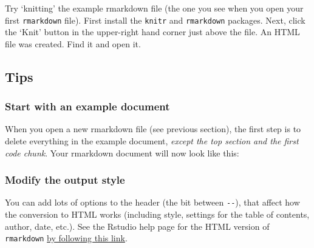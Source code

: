 \documentclass[]{book}
\newenvironment{Shaded}{\begin{snugshade}}{\end{snugshade}}
\newcommand{\DataTypeTok}[1]{\textcolor[rgb]{0.13,0.29,0.53}{#1}}
\newcommand{\NormalTok}[1]{#1}
\newcommand{\OperatorTok}[1]{\textcolor[rgb]{0.81,0.36,0.00}{\textbf{#1}}}
\newcommand{\StringTok}[1]{\textcolor[rgb]{0.31,0.60,0.02}{#1}}
\let\BeginKnitrBlock\begin \let\EndKnitrBlock\end
\begin{document}
\BeginKnitrBlock{rmdtry}
Try `knitting' the example rmarkdown file (the one you see when you open your first \texttt{rmarkdown} file). First install the \texttt{knitr} and \texttt{rmarkdown} packages. Next, click the `Knit' button in the upper-right hand corner just above the file. An HTML file was created. Find it and open it.
\EndKnitrBlock{rmdtry}

\hypertarget{tips}{%
\subsection{Tips}\label{tips}}

\hypertarget{start-with-an-example-document}{%
\subsubsection*{Start with an example document}\label{start-with-an-example-document}}

When you open a new rmarkdown file (see previous section), the first step is to delete everything in the example document, \emph{except the top section and the first code chunk}. Your rmarkdown document will now look like this:

\begin{Shaded}
\end{Shaded}

\hypertarget{modify-the-output-style}{%
\subsubsection*{Modify the output style}\label{modify-the-output-style}}

You can add lots of options to the header (the bit between \texttt{-\/-}), that affect how the conversion to HTML works (including style, settings for the table of contents, author, date, etc.). See the Rstudio help page for the HTML version of \texttt{rmarkdown} \href{https://bookdown.org/yihui/rmarkdown/html-document.html}{by following this link}.
\end{document}
